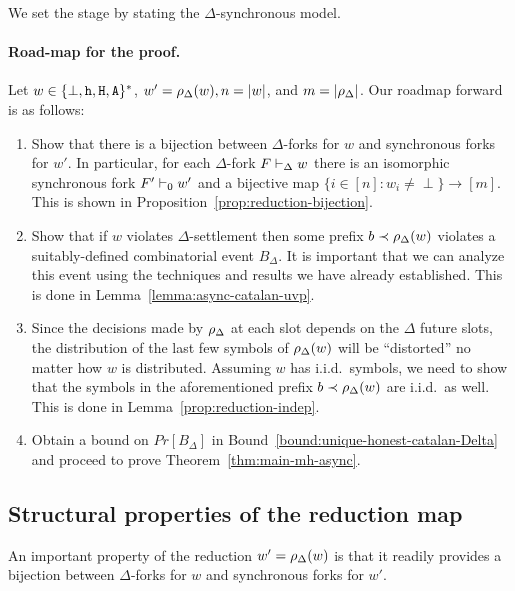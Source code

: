 We set the stage by stating the $\Delta$-synchronous model.



\paragraph{Road-map for the proof.}
Let $w \in \{\perp, \mathtt{h}, \mathtt{H}, \mathtt{A}\}^*$, 
$w' = \rho_\Delta(w), n = |w|$, and $m = |\rho_\Delta|$. 
Our roadmap forward is as follows:
\begin{enumerate}
  \item 
  Show that there is a bijection between 
  $\Delta$-forks for $w$ and 
  synchronous forks for $w'$. 
  In particular, for each $\Delta$-fork $F \vdash_\Delta w$ 
  there is an isomorphic synchronous fork $F' \vdash_0 w'$ 
  and a bijective map $\{i \in [n] : w_i \neq \perp\} \rightarrow [m]$. 
  This is shown in Proposition~\ref{prop:reduction-bijection}.

  \item Show that if $w$ violates $\Delta$-settlement 
  then some prefix $b \prec \rho_\Delta(w)$ violates 
  a suitably-defined combinatorial event $B_\Delta$.   
  It is important that we can analyze this event 
  using the techniques and results we have already established.
  This is done in Lemma~\ref{lemma:async-catalan-uvp}.

  \item Since the decisions made by $\rho_\Delta$ at each slot 
  depends on the $\Delta$ future slots, 
  the distribution of the last few symbols of $\rho_\Delta(w)$ 
  will be ``distorted'' no matter how $w$ is distributed. 
  Assuming $w$ has i.i.d.\ symbols, we need to 
  show that the symbols 
  in the aforementioned prefix $b \prec \rho_\Delta(w)$ 
  are i.i.d.\ as well. 
  This is done in Lemma~\ref{prop:reduction-indep}.

  \item Obtain a bound on $Pr[B_\Delta]$ in Bound~\ref{bound:unique-honest-catalan-Delta} and 
  proceed to prove Theorem~\ref{thm:main-mh-async}.
\end{enumerate}



\subsection{Structural properties of the reduction map}
An important property of the reduction $w' = \rho_\Delta(w)$ is that 
it readily provides a bijection between $\Delta$-forks for $w$ 
and synchronous forks for $w'$.

